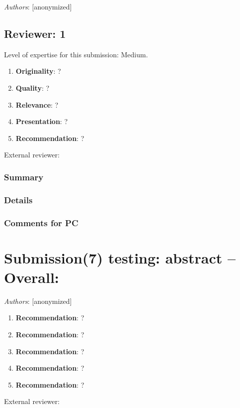 \documentclass{article}
\begin{document}
\textit{Authors}: [anonymized]

     
 \subsection{Reviewer:  1 }
    
   Level of expertise for this submission: Medium.   
\begin{enumerate}
    
      \item \textbf{Originality}: ?
      \item \textbf{Quality}: ?
      \item \textbf{Relevance}: ?
      \item \textbf{Presentation}: ?
      \item \textbf{Recommendation}: ?
 \end{enumerate}
External reviewer:      
   \subsubsection*{Summary}
   
      
   \subsubsection*{Details}
   

   \subsubsection*{Comments for PC}
   

  

\section{Submission(7) testing: abstract -- Overall: }  

\textit{Authors}: [anonymized]

     
\begin{enumerate}
    
      \item \textbf{Recommendation}: ?
      \item \textbf{Recommendation}: ?
      \item \textbf{Recommendation}: ?
      \item \textbf{Recommendation}: ?
      \item \textbf{Recommendation}: ?
 \end{enumerate}
External reviewer:      
\end{document}
